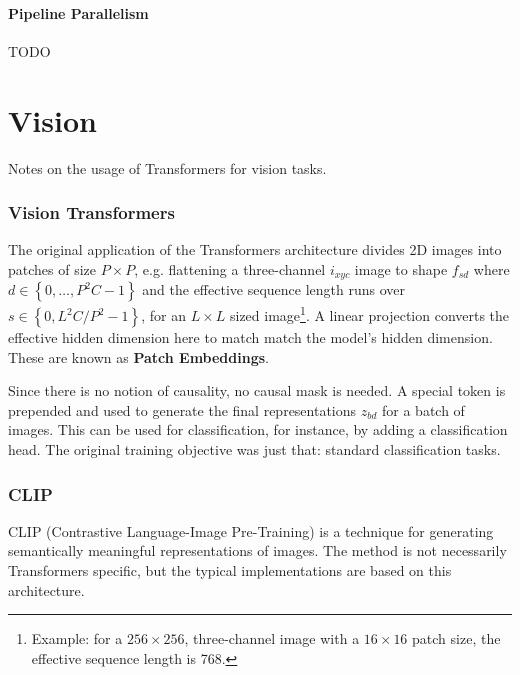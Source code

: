 \documentclass[11pt]{article}
\begin{document}
\subsection{Pipeline Parallelism \label{subsec_pipe_parallelism}}

TODO

\newpage
\part{Vision}

Notes on the usage of Transformers for vision tasks.

\section{Vision Transformers \label{sec_vit}}

The original application of the Transformers architecture \cite{dosovitskiy2021imageworth16x16words}
divides 2D images into patches of size $ P\times P $, e.g. flattening a three-channel $ i _{xyc} $
image to shape $ f _{ s d  } $ where $ d \in \left \{ 0, \ldots , P ^{ 2 }C-1 \right \} $ and the
effective sequence length runs over $ s \in \left \{ 0, L ^{ 2 }C /P ^{ 2 }-1 \right \} $, for an $
L\times L $ sized image\footnote{Example: for a $ 256\times 256 $, three-channel image with a $
16\times 16 $ patch size, the effective sequence length is 768.}. A linear projection converts the
effective hidden dimension here to match match the model's hidden dimension. These are known as
\textbf{Patch Embeddings}.

Since there is no notion of causality, no causal mask is needed. A special \pyinline{[CLS]} token is
prepended and used to generate the final representations $ z _{ bd } $ for a batch of images. This
can be used for classification, for instance, by adding a classification head.  The original
training objective was just that: standard classification tasks.



\section{CLIP \label{sec_clip}}

CLIP (Contrastive Language-Image Pre-Training) \cite{radford2021learningtransferablevisualmodels} is
a technique for generating semantically meaningful representations of images. The method is not
necessarily Transformers specific, but the typical implementations are based on this architecture.
\end{document}
